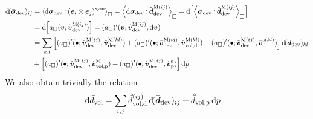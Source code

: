 \documentclass[10pt,a4paper]{article}
\newcommand{\ded}{\mathrm{d}}
\newcommand{\dep}{\mathrm{p}}
\begin{document}
\begin{align}
    \dif(\bar{\ts\sigma}_\dev)_{ij}
    & = 
    \left\langle \dif\ts{\sigma}_\dev\dprod\left(\bee ij\right)^\sym\right\rangle_\Box=
    \left\langle \dif\ts{\sigma}_\dev\dprod\hat{\ts{d}}^{\macro(ij)}_\dev\right\rangle_\Box=
    \dif\left[\left\langle \ts{\sigma}_\dev \dprod \hat{\ts{d}}^{\macro(ij)}_\dev \right\rangle_\Box\right]
    \nonumber \\
    & = 
    \dif\left[a_\Box(\ta{v}; \hat{\ta{v}}^{\macro(ij)}_\dev)\right] = ({a}_\Box)'(\ta{v}; \hat{\ta{v}}^{\macro(ij)}_\dev,\dif\ta{v})
    \nonumber \\
    & = 
    \sum_{k,l}\left[
    (a_\Box)'(\bullet;\hat{\ta{v}}^{\macro(ij)}_\dev,\hat{\ta{v}}^{\macro(kl)}_\dev) +
    (a_\Box)'(\bullet;\hat{\ta{v}}^{\macro(ij)}_\dev,\hat{\ta{v}}^{\macro(kl)}_{\vol,\ded}) +
    (a_\Box)'(\bullet;\hat{\ta{v}}^{\macro(ij)}_\dev,\hat{\ta{v}}^{\fluct(kl)}_\ded)
    \right]\dif(\bar{\ts d}_\dev)_{kl}
    \nonumber \\
    &
    + \left[(a_\Box)'(\bullet;\hat{\ta{v}}^{\macro(ij)}_\dev,\hat{\ta{v}}^{\macro}_{\vol,\dep}) +
    (a_\Box)'(\bullet;\hat{\ta{v}}^{\macro(ij)}_\dev,\hat{\ta{v}}^{\fluct}_\dep)
    \right]\dif\bar{p}
    \label{eq219}
\end{align}
We also obtain trivially the relation
\begin{align}
    \dif\bar{d}_\vol
    & = 
    \sum_{i,j}\hat{\bar{d}}^{(ij)}_{\vol,\ded}\dif(\bar{\ts d}_\dev)_{ij} + \hat{\bar{d}}_{\vol,\dep}\dif\bar{p}
    \label{eq220}
\end{align}
\end{document}
